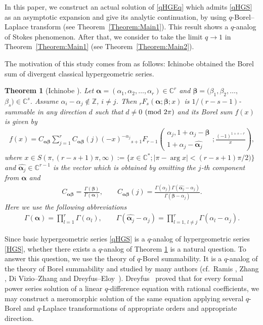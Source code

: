 \documentclass[pdftex]{sigma}
\numberwithin{equation}{section}
\newtheorem{Theorem}{Theorem}[section]
\begin{document}
In this paper, we construct an actual solution of \eqref{qHGEq} which admits \eqref{qHGS} as an asymptotic expansion and give its analytic continuation, by using $q$-Borel--Laplace transform (see Theorem~\ref{Theorem:Main1}). This result shows a $q$-analog of Stokes phenomenon. After that, we consider to take the limit $q\to1$ in Theorem~\ref{Theorem:Main1} (see Theorem~\ref{Theorem:Main2}).

The motivation of this study comes from as follows: Ichinobe \cite{Ichinobe2001} obtained the Borel sum of divergent classical hypergeometric series.
\begin{Theorem}[Ichinobe {\cite[Theorem 2.1]{Ichinobe2001}}]\label{Theorem:Ichinobe}
Let $\bm{\alpha}=(\alpha_1,\alpha_2,\ldots,\alpha_r)\in\mathbb{C}^r$ and $\bm{\beta}=(\beta_1,\beta_2,\ldots,$ $\beta_s)\in\mathbb{C}^s$. Assume $\alpha_i-\alpha_j\notin\mathbb{Z}$, $i\neq j$. Then ${}_rF_s(\bm{\alpha};\bm{\beta};x)$ is $1/(r-s-1)$-summable in any direction $d$ such that $d\neq0$ $({\rm mod}~2\pi)$ and its Borel sum $f(x)$ is given by
\begin{gather*}\label{Ichinobe_result1}
f(x)=C_{\bm{\alpha\beta}}\sum_{j=1}^rC_{\bm{\alpha\beta}}(j)(-x)^{-\alpha_j}{}_{s+1}F_{r-1}\left( \begin{matrix}
\alpha_j,1+\alpha_j-\bm{\beta}\\
1+\alpha_j-\widehat{\bm{\alpha}_j}
\end{matrix}
;\frac{(-1)^{1+s-r}}{x}\right),
\end{gather*}
where $x\in S(\pi,(r-s+1)\pi,\infty):=\{x\in\mathbb{C}^*;\left|\pi-\arg x\right|<(r-s+1)\pi/2)\}$ and $\widehat{\bm{\alpha}_j}\in\mathbb{C}^{r-1}$ is the vector which is obtained by omitting the $j$-th component from $\bm{\alpha}$ and
\begin{gather}\label{Ichinobe_result2}
C_{\bm{\alpha\beta}}=\frac{\Gamma(\bm{\beta})}{\Gamma(\bm{\alpha})},\qquad C_{\bm{\alpha\beta}}(j)=\frac{\Gamma(\alpha_j)\Gamma(\widehat{\bm{\alpha}_j}-\alpha_j)}{\Gamma(\bm{\beta}-\alpha_j)}.
\end{gather}
Here we use the following abbreviations
\begin{gather*}
\Gamma(\bm{\alpha})=\prod_{l=1}^r\Gamma(\alpha_l),\qquad \Gamma(\widehat{\bm{\alpha}_j}-\alpha_j)=\prod_{l=1,\,l\neq j}^r\Gamma(\alpha_l-\alpha_j).
\end{gather*}
\end{Theorem}
Since basic hypergeometric series \eqref{qHGS} is a $q$-analog of hypergeometric series \eqref{HGS}, whether there exists a $q$-analog of Theorem \ref{Theorem:Ichinobe} is a natural question. To answer this question, we use the theory of $q$-Borel summability. It is a $q$-analog of the theory of Borel summability and studied by many authors (cf.~Ramis \cite{Ramis1992}, Zhang \cite{Zhang2002,Zhang2005}, Di Vizio--Zhang \cite{Vizio-Zhang} and Dreyfus--Eloy~\cite{DreyfusEloy2016}). Dreyfus~\cite{Dreyfus2015_1} proved that for every formal power series solution of a linear $q$-difference equation with rational coefficients, we may construct a meromorphic solution of the same equation applying several $q$-Borel and $q$-Laplace transformations of appropriate orders and appropriate direction.
\end{document}
